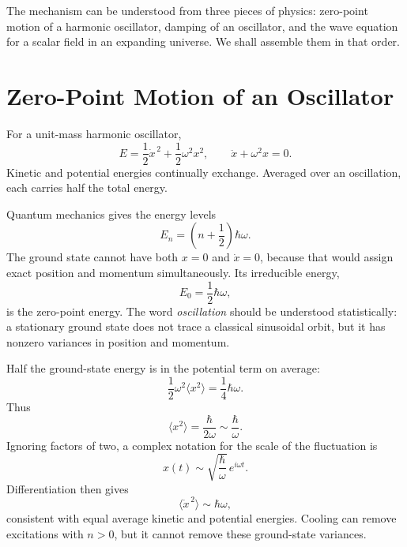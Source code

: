 \begin{classroomqa}
\end{classroomqa}

The mechanism can be understood from three pieces of physics: zero-point motion of a harmonic oscillator, damping of an oscillator, and the wave equation for a scalar field in an expanding universe. We shall assemble them in that order.

\section{Zero-Point Motion of an Oscillator}

For a unit-mass harmonic oscillator,
\begin{equation}
E=\frac12\dot x^{\,2}+\frac12\omega^2x^2,
\qquad
\ddot x+\omega^2x=0.
\label{eq:c10-undamped}
\end{equation}
Kinetic and potential energies continually exchange. Averaged over an oscillation, each carries half the total energy.

Quantum mechanics gives the energy levels
\begin{equation}
E_n=\left(n+\frac12\right)\hbar\omega.
\label{eq:c10-oscillator-levels}
\end{equation}
The ground state cannot have both \(x=0\) and \(\dot x=0\), because that would assign exact position and momentum simultaneously. Its irreducible energy,
\[
E_0=\frac12\hbar\omega,
\]
is the zero-point energy. The word \emph{oscillation} should be understood statistically: a stationary ground state does not trace a classical sinusoidal orbit, but it has nonzero variances in position and momentum.

Half the ground-state energy is in the potential term on average:
\[
\frac12\omega^2\langle x^2\rangle
=\frac14\hbar\omega.
\]
Thus
\begin{equation}
\langle x^2\rangle=\frac{\hbar}{2\omega}
\sim\frac{\hbar}{\omega}.
\label{eq:c10-zero-point-position}
\end{equation}
Ignoring factors of two, a complex notation for the scale of the fluctuation is
\[
x(t)\sim\sqrt{\frac{\hbar}{\omega}}\,e^{i\omega t}.
\]
Differentiation then gives
\begin{equation}
\langle\dot x^{\,2}\rangle\sim\hbar\omega,
\label{eq:c10-zero-point-velocity}
\end{equation}
consistent with equal average kinetic and potential energies. Cooling can remove excitations with \(n>0\), but it cannot remove these ground-state variances.

